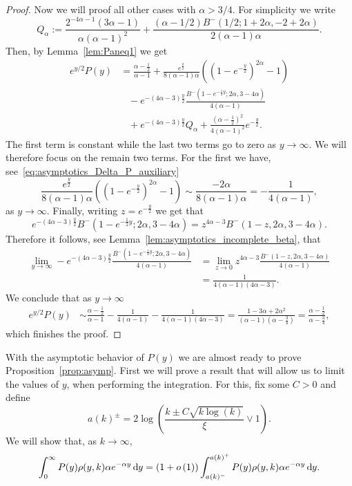\begin{proof}
Now we will proof all other cases with $\alpha > 3/4$. For simplicity we write
\[
	Q_\alpha := \frac{2^{-4 \alpha-1} (3 \alpha - 1)}{\alpha (\alpha - 1)^2} 
		+ \frac{(\alpha - 1/2 ) B^-(1/2; 1 + 2 \alpha, -2 + 2 \alpha)}{2(\alpha - 1) \alpha}.
\]
Then, by Lemma~\ref{lem:Paneq1} we get
\begin{align*}
	e^{y/2} P(y) &= \frac{\alpha - \frac{1}{2}}{\alpha - 1} 
		+ \frac{e^{\frac{y}{2}}}{8(\alpha - 1)\alpha}\left(\left(1 - e^{-\frac{y}{2}}\right)^{2\alpha}-1\right)\\
	&\hspace{10pt}- e^{-(4\alpha - 3)\frac{y}{2}}\frac{B^-(1 - e^{-\frac{1}{2}y}; 2 \alpha, 3 - 4 \alpha)}{4 (\alpha - 1)}\\
	&\hspace{10pt}+ e^{-(4\alpha - 3)\frac{y}{2}}Q_\alpha + \frac{(\alpha-\frac{1}{2})^2}{4(\alpha-1)^2} e^{-\frac{y}{2}}.
\end{align*}
The first term is constant while the last two terms go to zero as $y \to \infty$. We will therefore focus on the remain two terms. For the first we have, see~\eqref{eq:asymptotics_Delta_P_auxiliary} 
\[
	\frac{e^{\frac{y}{2}}}{8(\alpha - 1)\alpha}\left(\left(1 - e^{-\frac{y}{2}}\right)^{2\alpha}-1\right) 
	\sim \frac{-2\alpha}{8(\alpha - 1)\alpha} = -\frac{1}{4(\alpha -1)},
\]
as $y \to \infty$. Finally, writing $z = e^{-\frac{y}{2}}$ we get that
\[
	e^{-(4\alpha - 3)\frac{y}{2}} B^-(1 - e^{-\frac{1}{2}y}; 2 \alpha, 3 - 4 \alpha)
	= z^{4\alpha - 3} B^-(1 - z, 2 \alpha, 3 - 4 \alpha).
\]
Therefore it follows, see Lemma~\ref{lem:asymptotics_incomplete_beta}, that
\begin{align*}
	\lim_{y \to \infty} - e^{-(4\alpha - 3)\frac{y}{2}}
		\frac{B^-(1 - e^{-\frac{1}{2}y}; 2 \alpha, 3 - 4 \alpha)}{4 (\alpha - 1)}
	&= \lim_{z \to 0} z^{4\alpha - 3} \frac{B^-(1 - z, 2 \alpha, 3 - 4 \alpha)}{4(\alpha - 1)}\\
	&= \frac{1}{4(\alpha - 1)(4\alpha - 3)}.
\end{align*}
We conclude that as $y \to \infty$
\begin{align*}
	e^{y/2} P(y) 
	&\sim \frac{\alpha - \frac{1}{2}}{\alpha - 1} -\frac{1}{4(\alpha -1)} - \frac{1}{4(\alpha - 1)(4\alpha - 3)}
	= \frac{1 - 3\alpha + 2 \alpha^2}{(\alpha - 1)(\alpha - \frac{3}{4})} 
	= \frac{\alpha - \frac{1}{2}}{\alpha - \frac{3}{4}},
\end{align*}
which finishes the proof.
\end{proof}

With the asymptotic behavior of $P(y)$ we are almost ready to prove Proposition~\ref{prop:asymp}. First we will prove a result that will allow us to limit the values of $y$, when performing the integration. For this, fix some $C > 0$ and define
\[
	a(k)^\pm = 2 \log\left(\frac{k \pm C \sqrt{k \log(k)}}{\xi} \vee 1\right).
\] 
We will show that, as $k \to \infty$,
\begin{equation}\label{eq:asymptotics_average_clustering_concentration}
	\int_0^\infty P(y) \rho(y,k) \alpha e^{-\alpha y} \operatorname{\mathrm{d}\hspace{-2pt}} y
	= (1+o\left(1\right)) \int_{a(k)^-}^{a(k)^+} P(y) \rho(y,k) \alpha e^{-\alpha y} \operatorname{\mathrm{d}\hspace{-2pt}} y.
\end{equation}

